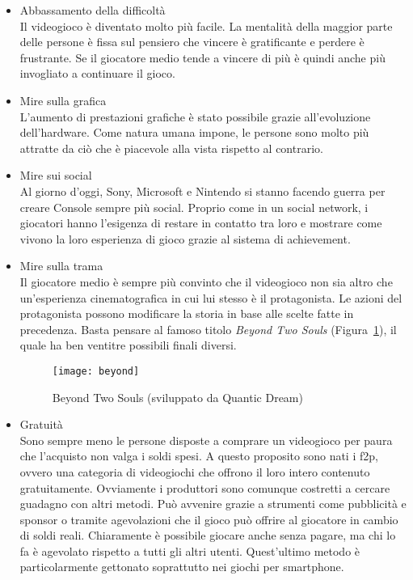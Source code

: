 \begin{itemize}
\item Abbassamento della difficoltà \\
Il videogioco è diventato molto più facile. La mentalità della maggior parte delle persone è fissa sul pensiero che vincere è gratificante e perdere è frustrante. Se il giocatore medio tende a vincere di più è quindi anche più invogliato a continuare il gioco.
\item Mire sulla grafica \\
L’aumento di prestazioni grafiche è stato possibile grazie all’evoluzione dell’hardware. Come natura umana impone, le persone sono molto più attratte da ciò che è piacevole alla vista rispetto al contrario.
\item Mire sui social \\
Al giorno d’oggi, Sony, Microsoft e Nintendo si stanno facendo guerra per creare Console sempre più social. Proprio come in un social network, i giocatori hanno l’esigenza di restare in contatto tra loro e mostrare come vivono la loro esperienza di gioco grazie al sistema di \gls{achievement}.
\item Mire sulla trama \\
Il giocatore medio è sempre più convinto che il videogioco non sia altro che un’esperienza cinematografica in cui lui stesso è il protagonista. Le azioni del protagonista possono modificare la storia in base alle scelte fatte in precedenza. Basta pensare al famoso titolo \textit{Beyond Two Souls} (Figura~\ref{fig:beyond}), il quale ha ben ventitre possibili finali diversi.
\begin{figure}[!ht]
\texttt{[image: beyond]}
\centering
\caption{Beyond Two Souls (sviluppato da Quantic Dream)}
\label{fig:beyond}
\end{figure}
\item Gratuità \\
Sono sempre meno le persone disposte a comprare un videogioco per paura che l’acquisto non valga i soldi spesi. A questo proposito sono nati i \gls{f2p}, ovvero una categoria di videogiochi che offrono il loro intero contenuto gratuitamente. Ovviamente i produttori sono comunque costretti a cercare guadagno con altri metodi. Può avvenire grazie a strumenti come pubblicità e sponsor o tramite agevolazioni che il gioco può offrire al giocatore in cambio di soldi reali. Chiaramente è possibile giocare anche senza pagare, ma chi lo fa è agevolato rispetto a tutti gli altri utenti. Quest’ultimo metodo è particolarmente gettonato soprattutto nei giochi per smartphone.

\end{itemize}

